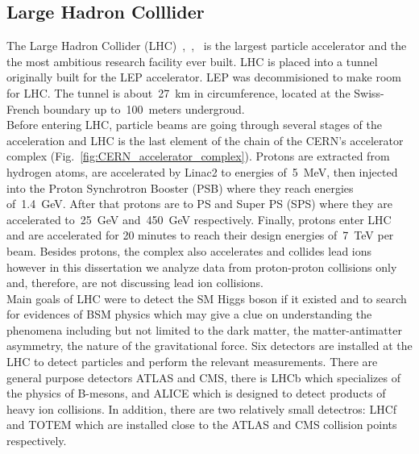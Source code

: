\subsection{Large Hadron Colllider}
\label{sec:Exp_LHC}
The Large Hadron Collider (LHC)~\cite{ref_LHC_brochure},~\cite{ref_LHC_TDR},~\cite{ref_LHC_website} is the largest particle accelerator and the the most ambitious research facility ever built. LHC is placed into a tunnel originally built for the LEP accelerator. LEP was decommisioned to make room for LHC. The tunnel is about~27~km in circumference, located at the Swiss-French boundary up to~100~meters undergroud.\\

Before entering LHC, particle beams are going through several stages of the acceleration and LHC is the last element of the chain of the CERN's accelerator complex (Fig.~\ref{fig:CERN_accelerator_complex}). Protons are extracted from hydrogen atoms, are accelerated by Linac2 to energies of~5~MeV, then injected into the Proton Synchrotron Booster (PSB) where they reach energies of~1.4~GeV. After that protons are to PS and Super PS (SPS) where they are accelerated to~25~GeV and~450~GeV respectively. Finally, protons enter LHC and are accelerated for 20 minutes to reach their design energies of~7~TeV per beam. Besides protons, the complex also accelerates and collides lead ions however in this dissertation we analyze data from proton-proton collisions only and, therefore, are not discussing lead ion collisions.\\    



Main goals of LHC were to detect the SM Higgs boson if it existed and to search for evidences of BSM physics which may give a clue on understanding the phenomena including but not limited to the dark matter, the matter-antimatter asymmetry, the nature of the gravitational force. Six detectors are installed at the LHC to detect particles and perform the relevant measurements. There are general purpose detectors ATLAS and CMS, there is LHCb which specializes of the physics of B-mesons, and ALICE which is designed to detect products of heavy ion collisions. In addition, there are two relatively small detectros: LHCf and TOTEM which are installed close to the ATLAS and CMS collision points respectively. \\

